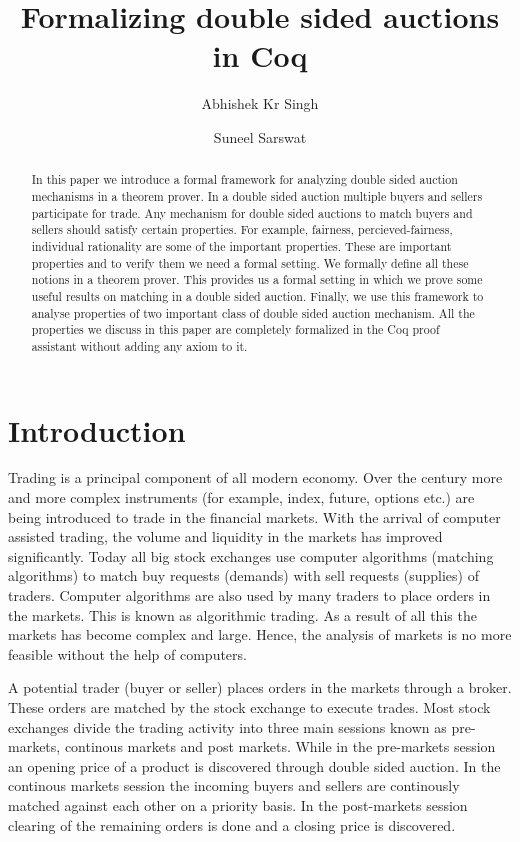 \documentclass[a4paper,UKenglish,cleveref, autoref]{lipics-v2019}
\title{Formalizing double sided auctions in Coq} %
\author{Abhishek Kr Singh}{Tata Institute of Fundamental Research, India} {abhishek.uor@gmail.com}
{}{}
\author{Suneel Sarswat}{Tata Institute of Fundamental Research, India} {suneel.sarswat@gmail.com}
{}{}
\begin{document}
\newcommand{\tw}{\texttt}

\maketitle

\begin{abstract}

In this paper we introduce a formal framework for analyzing double sided auction mechanisms in a theorem prover. In a double sided auction multiple buyers and sellers participate for trade. Any mechanism for double sided auctions to match buyers and sellers should satisfy certain properties. For example, fairness, percieved-fairness, individual rationality are some of the important properties. These are important properties and to verify them we need a formal setting. We formally define all these notions in a theorem prover. This provides us a  formal setting in which we prove some useful results on matching in a double sided auction. Finally, we use this framework to analyse properties of two important class of double sided auction mechanism. All the properties we discuss in this paper are completely formalized in the Coq proof assistant without adding any axiom to it.  
\end{abstract}

\section{Introduction}
\label{section1}

Trading is a principal component of all modern economy. Over the century more and more complex instruments (for example, index, future, options etc.) are being introduced to trade in the financial markets. With the arrival of computer assisted trading, the volume and liquidity in the markets has improved significantly. Today all big stock exchanges use computer algorithms (matching algorithms) to match buy requests (demands) with sell requests (supplies) of traders. Computer algorithms are also used by many traders to place orders  in the markets. This is known as algorithmic trading.  As a result of all this the markets has become complex and large. Hence, the analysis of markets is no more feasible without the help of computers. 

A potential trader (buyer or seller) places orders in the markets through a broker. These orders are matched by the stock exchange to execute trades. Most stock exchanges divide the trading activity into three main sessions known as pre-markets, continous markets and post markets. While in the pre-markets session an opening price of a product is discovered through double sided auction. In the continous markets session the incoming buyers and sellers are continously matched against each other on a priority basis. In the post-markets session clearing of the remaining orders is done and a closing price is discovered.
\end{document}
